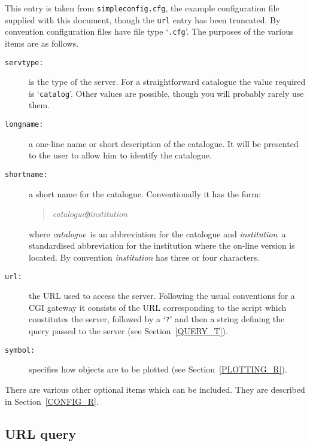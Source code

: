 \documentclass[twoside,11pt]{article}
\renewcommand{\_}{\texttt{\symbol{95}}}
\begin{document}
This entry is taken from {\tt simpleconfig.cfg}, the example configuration
file supplied with this document, though the {\tt url} entry has been
truncated.  By convention configuration files have file type `{\tt .cfg}'.
The purposes of the various items are as follows.

\begin{description}

  \item[{\tt serv\_type:}] is the type of the server.  For a
   straightforward catalogue the value required is `{\tt catalog}'.
   Other values are possible, though you will probably rarely use them.

  \item[{\tt long\_name:}] a one-line name or short description of the
   catalogue.  It will be presented to the user to allow him to identify
   the catalogue.

  \item[{\tt short\_name:}] a short name for the catalogue.  Conventionally
   it has the form:

  \begin{quote}
   {\it catalogue}{\tt @}{\it institution}
  \end{quote}

   where {\it catalogue}\, is an abbreviation for the catalogue and {\it
   institution}\, a standardised abbreviation for the institution where
   the on-line version is located.  By convention {\it institution}\/ has
   three or four characters.

  \item[{\tt url:}] the URL used to access the server.  Following the
   usual conventions for a CGI gateway it consists of the URL corresponding
   to the script which constitutes the server, followed by a `{\tt ?}'
   and then a string defining the query passed to the server (see
   Section~\ref{QUERY_T}).

  \item[{\tt symbol:}] specifies how objects are to be plotted (see
   Section~\ref{PLOTTING_R}).

\end{description}

There are various other optional items which can be included.  They are
described in Section~\ref{CONFIG_R}.

\subsection{\label{QUERY_T}URL query}
\end{document}
